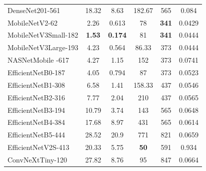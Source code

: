 \begin{table}[h!]
{\begin{tabular}{@{}lccccc@{}}
			DenseNet201-561       & 18.32         & 8.63           & 182.67      & 565          & 0.084  \\
			MobileNetV2-62        & 2.26          & 0.613          & 78          & \textbf{341} & 0.0429 \\
			MobileNetV3Small-182  & \textbf{1.53} & \textbf{0.174} & 81          & \textbf{341} & 0.0444 \\
			MobileNetV3Large-193  & 4.23          & 0.564          & 86.33       & 373          & 0.0444 \\
			NASNetMobile -617     & 4.27          & 1.15           & 152         & 373          & 0.0741 \\
			EfficientNetB0-187    & 4.05          & 0.794          & 87          & 373          & 0.0523 \\
			EfficientNetB1-308    & 6.58          & 1.41           & 158.33      & 437          & 0.0546 \\
			EfficientNetB2-316    & 7.77          & 2.04           & 210         & 437          & 0.0565 \\
			EfficientNetB3-194    & 10.79         & 3.74           & 143         & 565          & 0.0648 \\
			EfficientNetB4-384    & 17.68         & 8.97           & 431         & 565          & 0.0614 \\
			EfficientNetB5-444    & 28.52         & 20.9           & 771         & 821          & 0.0659 \\
			EfficientNetV2S-413   & 20.33         & 5.75           & \textbf{50} & 591          & 0.934  \\
			ConvNeXtTiny-120      & 27.82         & 8.76           & 95          & 847          & 0.0664 \\ \bottomrule
		\end{tabular}%
	}
\end{table}

